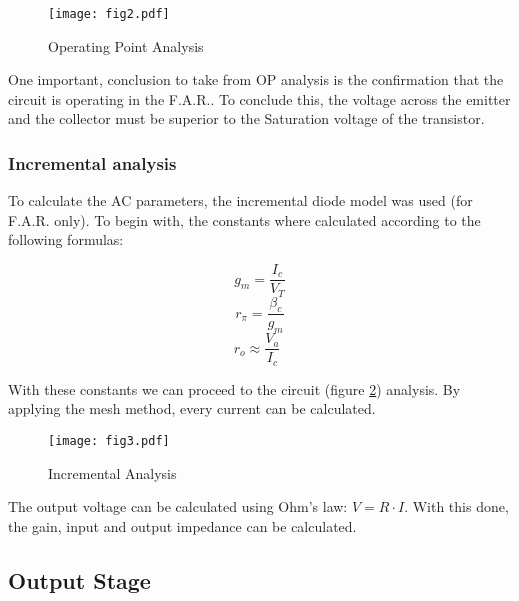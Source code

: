 \begin{figure}[h!]
    \centering
    \texttt{[image: fig2.pdf]}
    \caption{Operating Point Analysis}
    \label{fig:OP_Analysis}
\end{figure}

One important, conclusion to take from OP analysis is the confirmation that the circuit is operating in the F.A.R.. To conclude this, the voltage across the emitter and the collector must be superior to the Saturation voltage of the transistor.

\subsubsection*{Incremental analysis}

\indent

To calculate the AC parameters, the incremental diode model was used (for F.A.R. only). To begin with, the constants where calculated according to the following formulas:

\begin{equation}
    g_m= \frac{I_c}{V_T}
\end{equation}
\begin{equation}
    r_{\pi}=\frac{\beta_c}{g_m}
\end{equation}
\begin{equation}
    r_o \approx \frac{V_a}{I_c} \hspace{5pt}
\end{equation}

With these constants we can proceed to the circuit (figure \ref{fig:AC_Analysis}) analysis. By applying the mesh method, every current can be calculated.


\begin{figure}[h!]
    \centering
    \texttt{[image: fig3.pdf]}
    \caption{Incremental Analysis}
    \label{fig:AC_Analysis}
\end{figure}

The output voltage can be calculated using Ohm's law: $V= R \cdot I$. With this done, the gain, input and output impedance can be calculated.

\subsection{Output Stage}

\indent

